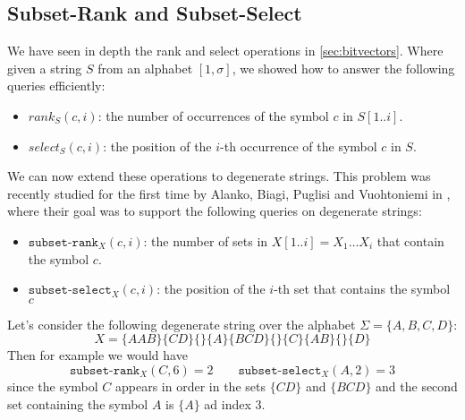 \subsection{Subset-Rank and Subset-Select}
We have seen in depth the rank and select operations in \autoref{sec:bitvectors}. Where given a string $S$ from an alphabet $[1,\sigma]$, we showed how to answer the following queries efficiently:
\begin{itemize}
    \item $rank_S(c, i)$: the number of occurrences of the symbol $c$ in $S[1..i]$.
    \item $select_S(c, i)$: the position of the $i$-th occurrence of the symbol $c$ in $S$.
\end{itemize}
We can now extend these operations to degenerate strings. This problem was recently studied for the first time by Alanko, Biagi, Puglisi and Vuohtoniemi in \cite{SubsetWT}, where their goal was to support the following queries on degenerate strings:
\begin{itemize}
    \item $\texttt{subset-rank}_X(c, i)$: the number of sets in $X[1..i]=X_1 \dots X_i$ that contain the symbol $c$.
    \item $\texttt{subset-select}_X(c, i)$: the position of the $i$-th set that contains the symbol $c$
\end{itemize}
\begin{example}
    Let's consider the following degenerate string over the alphabet $\Sigma = \{A, B, C, D\}$:
    \[
        X = \{AAB\} \{CD\} \{\} \{A\} \{BCD\} \{\} \{C\} \{AB\} \{\} \{D\}
    \]
    Then for example we would have
    \begin{equation*}
        \texttt{subset-rank}_X(C, 6) = 2 \qquad \texttt{subset-select}_X(A, 2) = 3
    \end{equation*}
    since the symbol $C$ appears in order in the sets $\{CD\}$ and $\{BCD\}$ and the second set containing the symbol $A$ is $\{A\}$ ad index $3$.
\end{example}
